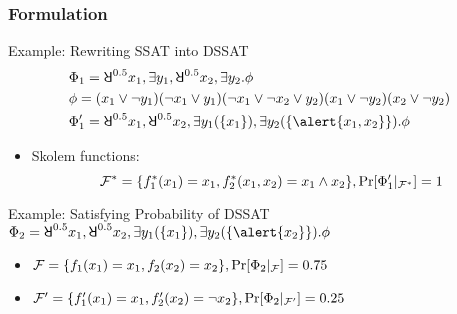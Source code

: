 \begin{frame}
  \frametitle{Formulation}
  \begin{block}{Example: Rewriting SSAT into DSSAT}
    \abovedisplayskip=0pt
    \belowdisplayskip=0pt
    \begin{align*}
       & \Qf_1=\random{0.5} x_1, \exists y_1, \random{0.5} x_2, \exists y_2. \pf                                 \\
       & \pf=(x_1 \lor \lnot y_1)
      (\lnot x_1 \lor y_1)
      (\lnot x_1 \lor \lnot x_2 \lor y_2)
      (x_1 \lor \lnot y_2)
      (x_2 \lor \lnot y_2)                                                                                       \\
       & \Qf_1' = \random{0.5} x_1, \random{0.5} x_2, \exists y_1(\{x_1\}), \exists y_2(\{\alert{x_1,x_2}\}).\pf
    \end{align*}\pause
    \begin{itemize}
      \item Skolem functions:
            \begin{equation*}
              \mathcal{F}^*=\{f^*_1(x_1)=x_1,f^*_2(x_1,x_2)=x_1 \land x_2\},\Pr[\Phi_1'|_{\mathcal{F}^*}]=1
            \end{equation*}
    \end{itemize}
  \end{block}\pause
  \begin{block}{Example: Satisfying Probability of DSSAT}
    \abovedisplayskip=0pt
    $\Qf_2 = \random{0.5} x_1, \random{0.5} x_2, \exists y_1(\{x_1\}), \exists y_2(\{\alert{x_2}\}).\pf$
    \pause
    \begin{itemize}
      \item $\mathcal{F}=\{f_1(x_1)=x_1,f_2(x_2)=x_2\},\Pr[\Phi_2|_{\mathcal{F}}]=0.75$\pause
      \item $\mathcal{F}'=\{f_1'(x_1)=x_1,f_2'(x_2)=\neg x_2\},\Pr[\Phi_2|_{\mathcal{F}'}]=0.25$
    \end{itemize}
  \end{block}
\end{frame}